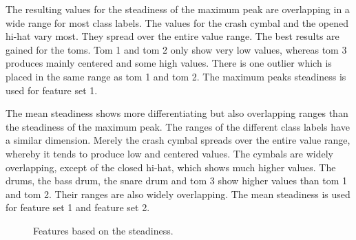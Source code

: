 \begin{figure}[tp]
{		\label{fig:visFrame2F}
	}
\end{figure}


The resulting values for the steadiness of the maximum peak are overlapping in a wide range for most class labels. The values for the crash cymbal and the opened hi-hat vary most. They spread over the entire value range. The best results are gained for the toms. Tom 1 and tom 2 only show very low values, whereas tom 3 produces mainly centered and some high values. There is one outlier which is placed in the same range as tom 1 and tom 2. The maximum peaks steadiness is used for feature set 1.

The mean steadiness shows more differentiating but also overlapping ranges than the steadiness of the maximum peak. The ranges of the different class labels have a similar dimension. Merely the crash cymbal spreads over the entire value range, whereby it tends to produce low and centered values. The cymbals are widely overlapping, except of the closed hi-hat, which shows much higher values. The drums, the bass drum, the snare drum and tom 3 show higher values than tom 1 and tom 2. Their ranges are also widely overlapping. The mean steadiness is used for feature set 1 and feature set 2.

\begin{figure}[tp]
	\centering
	\caption{Features based on the steadiness.}
	\label{fig:visS}
\end{figure}

